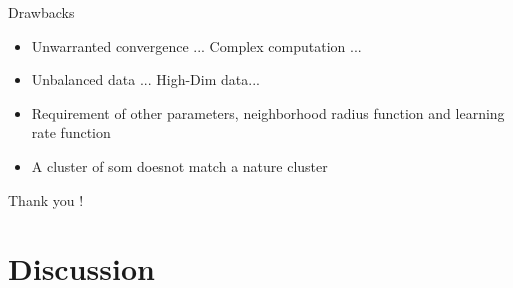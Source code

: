 \begin{frame}
    \begin{block}{Drawbacks}
        \begin{itemize}
            \item Unwarranted convergence ... Complex computation ... 
            \item Unbalanced data ... High-Dim data...
            \item Requirement of other parameters, neighborhood radius function and learning rate function
            \item A cluster of som doesnot match a nature cluster
        \end{itemize}
    \end{block}

    \vspace{24pt}

\begin{flushright}
    Thank you !
\end{flushright}
\end{frame}

\section{Discussion}
\begin{frame}    
\sectionpage
\end{frame}